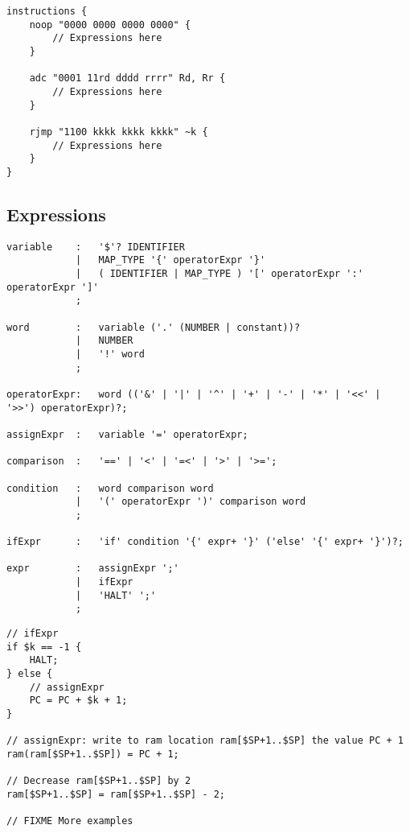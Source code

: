 \lstset{caption=Example instructions}
\begin{lstlisting}
instructions {
	noop "0000 0000 0000 0000" {
		// Expressions here
	}

	adc "0001 11rd dddd rrrr" Rd, Rr {
		// Expressions here
	}

	rjmp "1100 kkkk kkkk kkkk" ~k {
		// Expressions here
	}
}
\end{lstlisting}

\subsection{Expressions}
\lstset{caption=Expression specification}
\begin{lstlisting}
variable	:	'$'? IDENTIFIER
			|	MAP_TYPE '{' operatorExpr '}'
			|	( IDENTIFIER | MAP_TYPE ) '[' operatorExpr ':' operatorExpr ']'
			;

word 		:	variable ('.' (NUMBER | constant))?
			|	NUMBER
			|	'!' word
			;

operatorExpr:	word (('&' | '|' | '^' | '+' | '-' | '*' | '<<' | '>>') operatorExpr)?;

assignExpr	:	variable '=' operatorExpr;

comparison	:	'==' | '<' | '=<' | '>' | '>=';

condition	:	word comparison word
			|	'(' operatorExpr ')' comparison word
			;

ifExpr		:	'if' condition '{' expr+ '}' ('else' '{' expr+ '}')?;

expr		:	assignExpr ';'
			|	ifExpr
			|	'HALT' ';'
			;
\end{lstlisting}

\lstset{caption=Example expressions}
\begin{lstlisting}
// ifExpr
if $k == -1 {
	HALT;
} else {
	// assignExpr
	PC = PC + $k + 1;
}

// assignExpr: write to ram location ram[$SP+1..$SP] the value PC + 1
ram(ram[$SP+1..$SP]) = PC + 1;

// Decrease ram[$SP+1..$SP] by 2
ram[$SP+1..$SP] = ram[$SP+1..$SP] - 2;

// FIXME More examples
\end{lstlisting}
